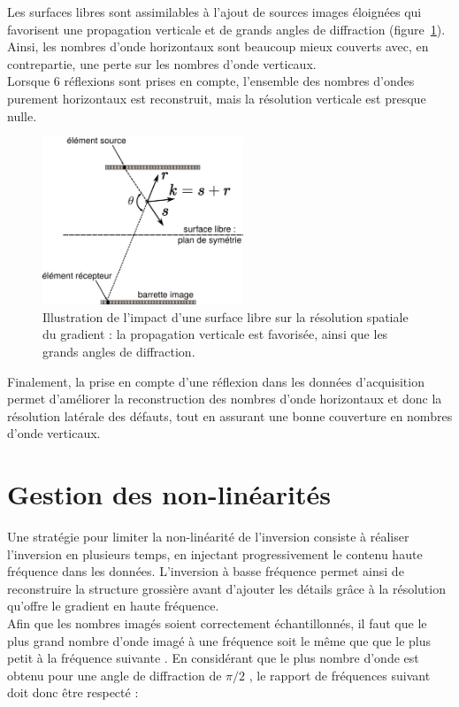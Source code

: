 Les surfaces libres sont assimilables à l'ajout de sources images éloignées qui favorisent une propagation verticale et de grands angles de diffraction (figure~\ref{app:reso_surf_libre}). Ainsi, les nombres d'onde horizontaux sont beaucoup mieux couverts avec, en contrepartie, une perte sur les nombres d'onde verticaux.  \\
Lorsque 6 réflexions sont prises en compte, l'ensemble des nombres d'ondes purement horizontaux est reconstruit, mais la résolution verticale est presque nulle.
\begin{figure}[!h]
	\centering
	\includegraphics[height=5cm]{img/reso_surf_libre.png}
	\caption{Illustration de l'impact d'une surface libre sur la résolution spatiale du gradient : la propagation verticale est favorisée, ainsi que les grands angles de diffraction.\label{app:reso_surf_libre}}
\end{figure}



Finalement, la prise en compte d'une réflexion dans les données d'acquisition permet d'améliorer la reconstruction des nombres d'onde horizontaux et donc la résolution latérale des défauts, tout en assurant une bonne couverture en nombres d'onde verticaux.


\section{Gestion des non-linéarités}
Une stratégie pour limiter la non-linéarité de l'inversion consiste à réaliser l'inversion en plusieurs temps, en injectant progressivement le contenu haute fréquence dans les données. L'inversion à basse fréquence permet ainsi de reconstruire la structure grossière avant d'ajouter les détails grâce à la résolution qu'offre le gradient en haute fréquence.\\



Afin que les nombres imagés soient correctement échantillonnés, il faut que le plus grand nombre d'onde imagé à une fréquence soit le même que que le plus petit à la fréquence suivante \citep{sirgue}. En considérant que le plus nombre d'onde est obtenu pour une angle de diffraction de $\pi/2$ , le rapport de fréquences suivant doit donc être respecté : 

